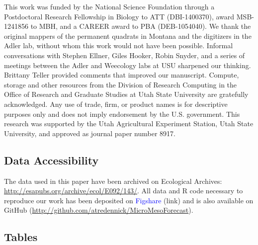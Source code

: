 \documentclass[12pt,]{article}
\begin{document}
This work was funded by the National Science Foundation through a
Postdoctoral Research Fellowship in Biology to ATT (DBI-1400370), award
MSB-1241856 to MBH, and a CAREER award to PBA (DEB-1054040). We thank
the original mappers of the permanent quadrats in Montana and the
digitizers in the Adler lab, without whom this work would not have been
possible. Informal conversations with Stephen Ellner, Giles Hooker,
Robin Snyder, and a series of meetings between the Adler and Weecology
labs at USU sharpened our thinking. Brittany Teller provided comments
that improved our manuscript. Compute, storage and other resources from
the Division of Research Computing in the Office of Research and
Graduate Studies at Utah State University are gratefully acknowledged.
Any use of trade, firm, or product names is for descriptive purposes
only and does not imply endorsement by the U.S. government. This
research was supported by the Utah Agricultural Experiment Station, Utah
State University, and approved as journal paper number 8917.

\subsection{Data Accessibility}\label{data-accessibility}

The data used in this paper have been archived on Ecological Archives:
\url{http://esapubs.org/archive/ecol/E092/143/}. All data and R code
necessary to reproduce our work has been deposited on
\textcolor{blue}{Figshare} (link) and is also available on GitHub
(\url{http://github.com/atredennick/MicroMesoForecast}).

\pagebreak{}

\subsection{Tables}\label{tables}
\end{document}
